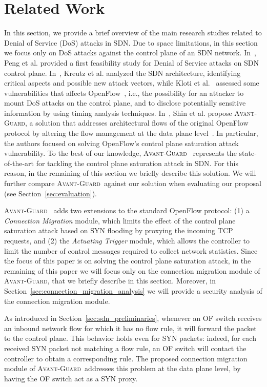 \documentclass{sig-alternate}
\newcommand{\avantguard}{\textsc{Avant-Guard}}
\begin{document}
\section{Related Work}\label{sec:related_work}

In this section, we provide a brief overview of the main research studies related to Denial of Service (DoS) attacks in SDN. 
Due to space limitations, in this section we focus only on DoS attacks against the control plane of an SDN network.
In~\cite{Peng:2007:SND:1216370.1216373}, Peng et al. provided a first feasibility study for Denial of Service attacks on SDN control plane. In~\cite{Kreutz:2013:TSD:2491185.2491199}, Kreutz et al. analyzed the SDN architecture, identifying critical aspects and possible new attack vectors, while Kloti et al.~\cite{Kloti} assessed some vulnerabilities that affects OpenFlow~\cite{openflow_whitepaper}, i.e., the possibility for an attacker to mount DoS attacks on the control plane, and to disclose potentially sensitive information by using timing analysis techniques.
In~\cite{AvantGuard}, Shin et al. propose \avantguard, a solution that addresses architectural flows of the original OpenFlow protocol by altering the flow management at the data plane level~\cite{of-guard, AvantGuard}. 
In particular, the authors focused on solving OpenFlow's control plane saturation attack vulnerability. 
To the best of our knowledge, \avantguard~\cite{AvantGuard} represents the state-of-the-art for tackling the control plane saturation attack in SDN. 
For this reason, in the remaining of this section we briefly describe this solution. 
We will further compare \avantguard~against our solution when evaluating our proposal (see Section~\ref{sec:evaluation}).

\avantguard~\cite{AvantGuard} adds two extensions to the standard OpenFlow protocol: 
(1) a {\em Connection Migration} module, which limits the effect of the control plane saturation attack based on SYN flooding by proxying the incoming TCP requests, and 
(2) the {\em Actuating Trigger} module, which allows the controller to limit the number of control messages required to collect network statistics.
Since the focus of this paper is on solving the control plane saturation attack, in the remaining of this paper we will focus only on the connection migration module of \avantguard, that we briefly describe in this section. Moreover, in Section~\ref{sec:connection_migration_analysis} 
we will provide a security analysis of the connection migration module.

As introduced in Section~\ref{sec:sdn_preliminaries}, whenever an OF switch receives an inbound network flow for which it has no flow rule, it will forward the packet to the control plane. This behavior holds even for SYN packets: indeed, for each received SYN packet not matching a flow rule, an OF switch will contact the controller to obtain a corresponding rule.
The proposed connection migration module of \avantguard~addresses this problem at the data plane level, 
by having the OF switch act as a SYN proxy. 
\end{document}
